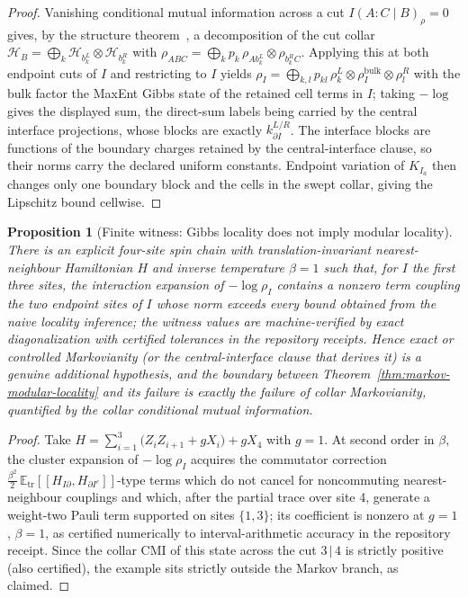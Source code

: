 \documentclass[11pt]{article}
\newtheorem{proposition}[theorem]{Proposition}
\begin{document}
\begin{proof}
Vanishing conditional mutual information across a cut
\(I(A:C\mid B)_{\rho}=0\) gives, by the structure
theorem~\cite{hjpw04}, a decomposition of the cut collar
\(\mathcal H_B=\bigoplus_k\mathcal H_{b_k^{L}}\otimes\mathcal H_{b_k^{R}}\)
with
\(\rho_{ABC}=\bigoplus_k p_k\,\rho_{Ab_k^{L}}\otimes\rho_{b_k^{R}C}\).
Applying this at both endpoint cuts of \(I\) and restricting to \(I\) yields
\(\rho_I=\bigoplus_{k,l}p_{kl}\,
\rho^{L}_{k}\otimes\rho^{\mathrm{bulk}}_{I}\otimes\rho^{R}_{l}\)
with the bulk factor the MaxEnt Gibbs state of the retained cell terms in
\(I\); taking \(-\log\) gives the displayed sum, the direct-sum labels being
carried by the central interface projections, whose blocks are exactly
\(k^{L/R}_{\partial I}\). The interface blocks are functions of the boundary
charges retained by the central-interface clause, so their norms carry the
declared uniform constants. Endpoint variation of \(K_{I_a}\) then changes
only one boundary block and the cells in the swept collar, giving the
Lipschitz bound cellwise.
\end{proof}

\begin{proposition}[Finite witness: Gibbs locality does not imply modular locality]
\label{prop:gibbs-modular-nonlocality-witness}
There is an explicit four-site spin chain with translation-invariant
nearest-neighbour Hamiltonian \(H\) and inverse temperature \(\beta=1\) such
that, for \(I\) the first three sites, the interaction expansion of
\(-\log\rho_I\) contains a nonzero term coupling the two endpoint sites of
\(I\) whose norm exceeds every bound obtained from the naive locality
inference; the witness values are machine-verified by exact diagonalization
with certified tolerances in the repository receipts. Hence exact or controlled Markovianity (or the
central-interface clause that derives it) is a genuine additional hypothesis,
and the boundary between Theorem~\ref{thm:markov-modular-locality} and its
failure is exactly the failure of collar Markovianity, quantified by the
collar conditional mutual information.
\end{proposition}

\begin{proof}
Take \(H=\sum_{i=1}^{3}\bigl(Z_iZ_{i+1}+gX_i\bigr)+gX_4\) with \(g=1\). At
second order in \(\beta\), the cluster expansion of \(-\log\rho_I\) acquires
the commutator correction
\(\tfrac{\beta^2}{2}\,\mathbb E_{\mathrm{tr}}\!\left[[H_{I\partial},H_{\partial I^c}]\right]\)-type
terms which do not cancel for noncommuting nearest-neighbour couplings and
which, after the partial trace over site 4, generate a weight-two Pauli term
supported on sites \(\{1,3\}\); its coefficient is nonzero at \(g=1\),
\(\beta=1\), as certified numerically to interval-arithmetic accuracy in the
repository receipt. Since the collar CMI of this state across the cut
\(3\,|\,4\) is strictly positive (also certified), the example sits strictly
outside the Markov branch, as claimed.
\end{proof}
\end{document}
